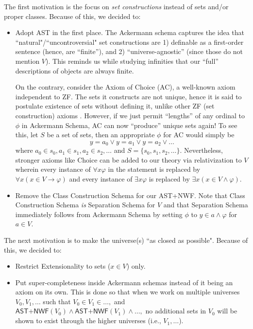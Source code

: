 \documentclass{article}
\begin{document}
The first motivation is the focus on \textit{set constructions} instead of sets and/or proper classes. Because of this, we decided to:
\begin{itemize}
\item Adopt AST in the first place. The Ackermann schema captures the idea that ``natural"/``uncontroversial" set constructions are 1) definable as a first-order sentence (hence, are ``finite''), and 2) ``universe-agnostic'' (since those do not mention $V$). This reminds us while studying infinities that our ``full'' descriptions of objects are always finite.

On the contrary, consider the Axiom of Choice (AC), a well-known axiom independent to ZF. The sets it constructs are not unique, hence it is said to postulate existence of sets without defining it, unlike other ZF (set construction) axioms \cite[Chapter 5]{jech}. However, if we just permit ``lengths'' of any ordinal to $\phi$ in Ackermann Schema, AC can now ``produce'' unique sets again! To see this, let $S$ be a set of sets, then an appropriate $\phi$ for AC would simply be $$y = a_0 \vee y = a_1 \vee y = a_2 \vee \ldots$$ where $a_0 \in s_0, a_1 \in s_1, a_2 \in s_2, \ldots$ and $S=\{s_0, s_1, s_2, \ldots\}$. Nevertheless, stronger axioms like Choice can be added to our theory via relativization to $V$ wherein every instance of $\forall x \varphi$ in the statement is replaced by $\forall x (x \in V \rightarrow \varphi)$ and every instance of $\exists x \varphi$ is replaced by $\exists x (x \in V \wedge \varphi)$.
\item Remove the Class Construction Schema for our \textsf{AST+NWF}. Note that Class Construction Schema \textit{is} Separation Schema for $V$ and that Separation Schema immediately follows from Ackermann Schema by setting $\phi$ to $y \in a \wedge \varphi$ for $a\in V$.
\end{itemize}

The next motivation is to make the universe(s) ``as closed as possible". Because of this, we decided to:
\begin{itemize}
\item Restrict Extensionality to sets ($x \in V$) only.
\item Put super-completeness inside Ackermann schemas instead of it being an axiom on its own. This is done so that when we work on multiple universes $V_0, V_1, \ldots$ such that $V_0 \in V_1 \in \ldots,$ and $\textsf{AST+NWF}(V_0) \wedge \textsf{AST+NWF}(V_1) \wedge\ldots,$ no additional sets in $V_0$ will be shown to exist through the higher universes (i.e., $V_1, \ldots$).
\end{itemize}
\end{document}
